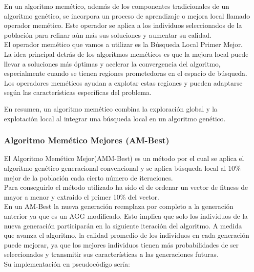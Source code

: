 En un algoritmo memético, además de los componentes tradicionales de un algoritmo genético, se incorpora un proceso de aprendizaje o mejora local llamado operador memético. Este operador se aplica a los individuos seleccionados de la población para refinar aún más sus soluciones y aumentar su calidad.\\

El operador memético que vamos a utilizar es la Búsqueda Local Primer Mejor.\\

La idea principal detrás de los algoritmos meméticos es que la mejora local puede llevar a soluciones más óptimas y acelerar la convergencia del algoritmo, especialmente cuando se tienen regiones prometedoras en el espacio de búsqueda. Los operadores meméticos ayudan a explotar estas regiones y pueden adaptarse según las características específicas del problema.

En resumen, un algoritmo memético combina la exploración global y la explotación local al integrar una búsqueda local en un algoritmo genético. 


\subsubsection{Algoritmo Memético Mejores (AM-Best)}
El Algoritmo Memético Mejor(AMM-Best) es un método por el cual se aplica el algoritmo genético generacional convencional y se aplica búsqueda local al 10\% mejor de la población cada cierto número de iteraciones.\\

Para conseguirlo el método utilizado ha sido el de ordenar un vector de fitness de mayor a menor y extraido el primer 10\% del vector.\\

En un AM-Best la nueva generación reemplaza por completo a la generación anterior ya que es un AGG modificado. Esto implica que solo los individuos de la nueva generación participarán en la siguiente iteración del algoritmo. A medida que avanza el algoritmo, la calidad promedio de los individuos en cada generación puede mejorar, ya que los mejores individuos tienen más probabilidades de ser seleccionados y transmitir sus características a las generaciones futuras.\\

Su implementación en pseudocódigo sería:

